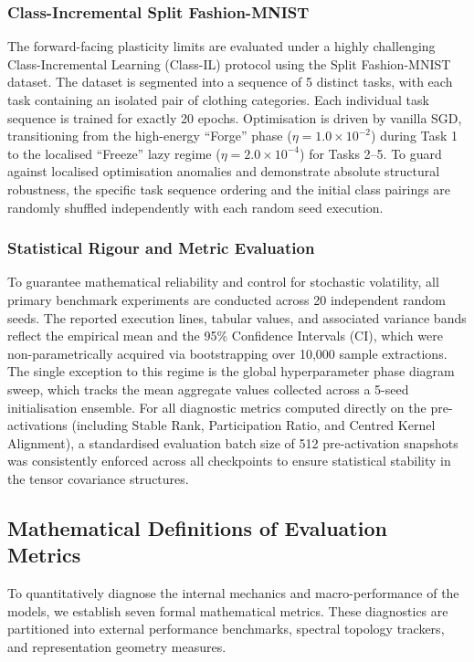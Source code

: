 \documentclass[10pt,a4paper]{article}
\begin{document}
	\subsubsection{Class-Incremental Split Fashion-MNIST}
	The forward-facing plasticity limits are evaluated under a highly challenging Class-Incremental Learning (Class-IL) protocol using the Split Fashion-MNIST dataset. The dataset is segmented into a sequence of 5 distinct tasks, with each task containing an isolated pair of clothing categories. Each individual task sequence is trained for exactly 20 epochs. Optimisation is driven by vanilla SGD, transitioning from the high-energy ``Forge'' phase ($\eta = 1.0 \times 10^{-2}$) during Task 1 to the localised ``Freeze'' lazy regime ($\eta = 2.0 \times 10^{-4}$) for Tasks 2--5. To guard against localised optimisation anomalies and demonstrate absolute structural robustness, the specific task sequence ordering and the initial class pairings are randomly shuffled independently with each random seed execution.
	
	\subsubsection{Statistical Rigour and Metric Evaluation}
	To guarantee mathematical reliability and control for stochastic volatility, all primary benchmark experiments are conducted across 20 independent random seeds. The reported execution lines, tabular values, and associated variance bands reflect the empirical mean and the 95\% Confidence Intervals (CI), which were non-parametrically acquired via bootstrapping over 10,000 sample extractions. The single exception to this regime is the global hyperparameter phase diagram sweep, which tracks the mean aggregate values collected across a 5-seed initialisation ensemble. For all diagnostic metrics computed directly on the pre-activations (including Stable Rank, Participation Ratio, and Centred Kernel Alignment), a standardised evaluation batch size of 512 pre-activation snapshots was consistently enforced across all checkpoints to ensure statistical stability in the tensor covariance structures.
	\subsection{Mathematical Definitions of Evaluation Metrics}
	
	To quantitatively diagnose the internal mechanics and macro-performance of the models, we establish seven formal mathematical metrics. These diagnostics are partitioned into external performance benchmarks, spectral topology trackers, and representation geometry measures.
	
\end{document}
